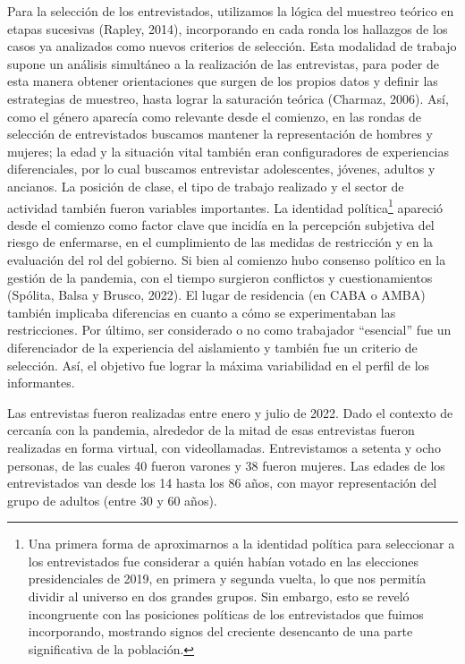 Para la selección de los entrevistados, utilizamos la lógica del muestreo teórico en etapas sucesivas (Rapley, 2014), incorporando en cada ronda los hallazgos de los casos ya analizados como nuevos criterios de selección. Esta modalidad de trabajo supone un análisis simultáneo a la realización de las entrevistas, para poder de esta manera obtener orientaciones que surgen de los propios datos y definir las estrategias de muestreo, hasta lograr la saturación teórica (Charmaz, 2006). Así, como el género aparecía como relevante desde el comienzo, en las rondas de selección de entrevistados buscamos mantener la representación de hombres y mujeres; la edad y la situación vital también eran configuradores de experiencias diferenciales, por lo cual buscamos entrevistar adolescentes, jóvenes, adultos y ancianos. La posición de clase, el tipo de trabajo realizado y el sector de actividad también fueron variables importantes. La identidad política\footnote{Una primera forma de aproximarnos a la identidad política para seleccionar a los entrevistados fue considerar a quién habían votado en las elecciones presidenciales de 2019, en primera y segunda vuelta, lo que nos permitía dividir al universo en dos grandes grupos. Sin embargo, esto se reveló incongruente con las posiciones políticas de los entrevistados que fuimos incorporando, mostrando signos del creciente desencanto de una parte significativa de la población.} apareció desde el comienzo como factor clave que incidía en la percepción subjetiva del riesgo de enfermarse, en el cumplimiento de las medidas de restricción y en la evaluación del rol del gobierno. Si bien al comienzo hubo consenso político en la gestión de la pandemia, con el tiempo surgieron conflictos y cuestionamientos (Spólita, Balsa y Brusco, 2022). El lugar de residencia (en CABA o AMBA) también implicaba diferencias en cuanto a cómo se experimentaban las restricciones. Por último, ser considerado o no como trabajador ``esencial'' fue un diferenciador de la experiencia del aislamiento y también fue un criterio de selección. Así, el objetivo fue lograr la máxima variabilidad en el perfil de los informantes.

Las entrevistas fueron realizadas entre enero y julio de 2022. Dado el contexto de cercanía con la pandemia, alrededor de la mitad de esas entrevistas fueron realizadas en forma virtual, con videollamadas. Entrevistamos a setenta y ocho personas, de las cuales 40 fueron varones y 38 fueron mujeres. Las edades de los entrevistados van desde los 14 hasta los 86 años, con mayor representación del grupo de adultos (entre 30 y 60 años).

